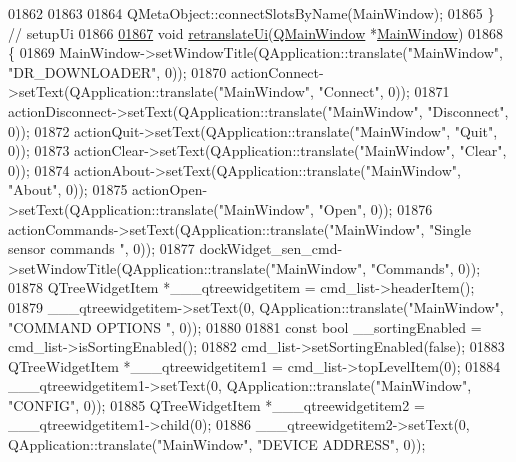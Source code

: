 \begin{DoxyCode}
01862 
01863 
01864         QMetaObject::connectSlotsByName(MainWindow);
01865     \} \textcolor{comment}{// setupUi}
01866 
\hypertarget{a00139_source_l01867}{}\hyperlink{a00080_a097dd160c3534a204904cb374412c618}{01867}     \textcolor{keywordtype}{void} \hyperlink{a00080_a097dd160c3534a204904cb374412c618}{retranslateUi}(\hyperlink{a00058}{QMainWindow} *\hyperlink{a00017}{MainWindow})
01868     \{
01869         MainWindow->setWindowTitle(QApplication::translate(\textcolor{stringliteral}{"MainWindow"}, \textcolor{stringliteral}{"DR\_DOWNLOADER"}, 0));
01870         actionConnect->setText(QApplication::translate(\textcolor{stringliteral}{"MainWindow"}, \textcolor{stringliteral}{"Connect"}, 0));
01871         actionDisconnect->setText(QApplication::translate(\textcolor{stringliteral}{"MainWindow"}, \textcolor{stringliteral}{"Disconnect"}, 0));
01872         actionQuit->setText(QApplication::translate(\textcolor{stringliteral}{"MainWindow"}, \textcolor{stringliteral}{"Quit"}, 0));
01873         actionClear->setText(QApplication::translate(\textcolor{stringliteral}{"MainWindow"}, \textcolor{stringliteral}{"Clear"}, 0));
01874         actionAbout->setText(QApplication::translate(\textcolor{stringliteral}{"MainWindow"}, \textcolor{stringliteral}{"About"}, 0));
01875         actionOpen->setText(QApplication::translate(\textcolor{stringliteral}{"MainWindow"}, \textcolor{stringliteral}{"Open"}, 0));
01876         actionCommands->setText(QApplication::translate(\textcolor{stringliteral}{"MainWindow"}, \textcolor{stringliteral}{"Single sensor commands "}, 0));
01877         dockWidget\_sen\_cmd->setWindowTitle(QApplication::translate(\textcolor{stringliteral}{"MainWindow"}, \textcolor{stringliteral}{"Commands"}, 0));
01878         QTreeWidgetItem *\_\_\_qtreewidgetitem = cmd\_list->headerItem();
01879         \_\_\_qtreewidgetitem->setText(0, QApplication::translate(\textcolor{stringliteral}{"MainWindow"}, \textcolor{stringliteral}{"COMMAND OPTIONS  "}, 0));
01880 
01881         \textcolor{keyword}{const} \textcolor{keywordtype}{bool} \_\_sortingEnabled = cmd\_list->isSortingEnabled();
01882         cmd\_list->setSortingEnabled(\textcolor{keyword}{false});
01883         QTreeWidgetItem *\_\_\_qtreewidgetitem1 = cmd\_list->topLevelItem(0);
01884         \_\_\_qtreewidgetitem1->setText(0, QApplication::translate(\textcolor{stringliteral}{"MainWindow"}, \textcolor{stringliteral}{"CONFIG"}, 0));
01885         QTreeWidgetItem *\_\_\_qtreewidgetitem2 = \_\_\_qtreewidgetitem1->child(0);
01886         \_\_\_qtreewidgetitem2->setText(0, QApplication::translate(\textcolor{stringliteral}{"MainWindow"}, \textcolor{stringliteral}{"DEVICE ADDRESS"}, 0));

\end{DoxyCode}
